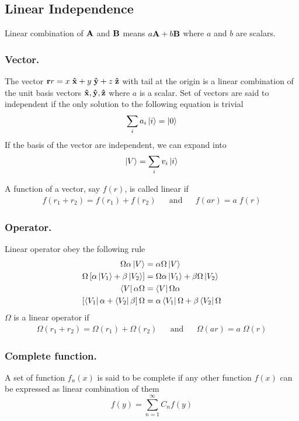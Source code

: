 \documentclass[../main.tex]{subfiles}
\begin{document}
\subsection*{Linear Independence}
Linear combination of $\mathbf{A}$ and $\mathbf{B}$ means $a\mathbf{A} + b\mathbf{B}$ where $a$ and $b$ are scalars.

\subsubsection*{Vector.}
The vector $\mathbf{r}r = x\;\mathbf{\hat{x}}+y\;\mathbf{\hat{y}}+z\;\mathbf{\hat{z}}$ with tail at the origin is a linear combination of the unit basis vectors $\mathbf{\hat{x}},\mathbf{\hat{y}},\mathbf{\hat{z}}$
where $a$ is a scalar.
Set of vectors are said to independent if the only solution to the following equation is trivial
\begin{equation*}
	\sum_i a_i\ket{i}=\ket{0}
\end{equation*}
If the basis of the vector are independent, we can expand into
\begin{equation*}
	\ket{V}=\sum_i v_i \ket{i}
\end{equation*}

A function of a vector, say $f (r)$, is called linear if
\begin{align*}
	f(r_1+r_2)= f(r_1)+ f(r_2) &  & \mathrm{and} &  & f(ar)=a\;f(r)
\end{align*}

\subsubsection*{Operator.}
Linear operator obey the following rule
\begin{align*}
	\Omega \alpha \ket{V}                               & =\alpha\Omega \ket{V}                         \\
	\Omega\left[\alpha \ket{V_1}+\beta \ket{V_2}\right] & =\Omega\alpha \ket{V_1}+\beta\Omega \ket{V_2} \\
	\bra{V}\alpha\Omega                                 & =\bra{V}\Omega\alpha                          \\
	\left[\bra{V_1}\alpha+\bra{V_2}\beta\right]\Omega   & =\alpha \bra{V_1}\Omega +\beta\bra{V_2}\Omega
\end{align*}
$\Omega$ is a linear operator if
\begin{align*}
	\Omega(r_1+r_2)= \Omega(r_1)+ \Omega(r_2) &  & \mathrm{and} &  & \Omega(ar)=a\;\Omega(r)
\end{align*}

\subsubsection*{Complete function.} A set of function $f_n(x)$ is said to be complete if any other function $f(x)$ can be expressed as linear combination of them
\begin{equation*}
	f(y)=\sum_{n=1}^{\infty} C_nf(y)
\end{equation*}
\end{document}
